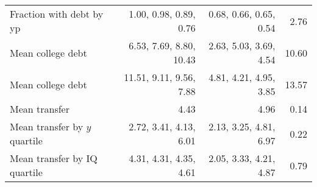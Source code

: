 \begin{tabular}{lrrr}
Fraction with debt by yp & 1.00, 0.98, 0.89, 0.76  & 0.68, 0.66, 0.65, 0.54  & 2.76  \\ 
Mean college debt & 6.53, 7.69, 8.80, 10.43  & 2.63, 5.03, 3.69, 4.54  & 10.60  \\ 
Mean college debt & 11.51, 9.11, 9.56, 7.88  & 4.81, 4.21, 4.95, 3.85  & 13.57  \\ 
Mean transfer & 4.43  & 4.96  & 0.14  \\ 
Mean transfer by $y$ quartile & 2.72, 3.41, 4.13, 6.01  & 2.13, 3.25, 4.81, 6.97  & 0.22  \\ 
Mean transfer by IQ quartile & 4.31, 4.31, 4.35, 4.61  & 2.05, 3.33, 4.21, 4.87  & 0.79  \\ 
\hline
\end{tabular}%
